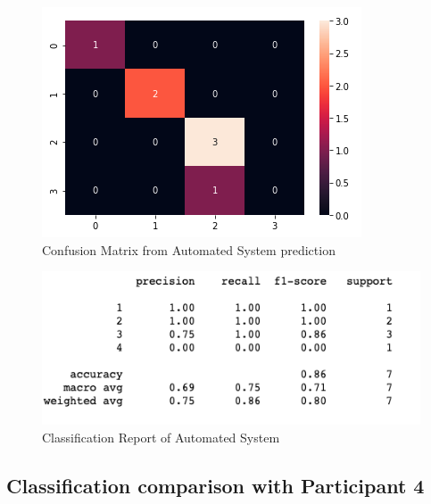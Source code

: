 \begin{figure}[!htp]
    \includegraphics[width=\textwidth]{Images/a3.png}
    \caption{Confusion Matrix from Automated System prediction}
    \label{fig:f11}
\end{figure}

\begin{figure}[!htp]
    \includegraphics[width=\textwidth]{Images/a3r.png}
    \caption{Classification Report of Automated System}
    \label{fig:f11}
\end{figure}

\pagebreak
\subsection*{Classification comparison with Participant 4 }

